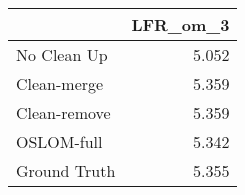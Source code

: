 \begin{tabular}{lr}
\toprule
{} & LFR_om_3 \\
\midrule
No Clean Up  &    5.052 \\
Clean-merge  &    5.359 \\
Clean-remove &    5.359 \\
OSLOM-full   &    5.342 \\
Ground Truth &    5.355 \\
\bottomrule
\end{tabular}
